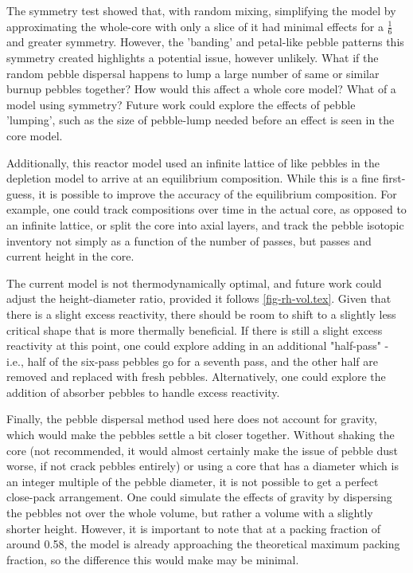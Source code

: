 The symmetry test showed that, with random mixing, simplifying the model by approximating the whole-core with only a slice of it had minimal effects for a $\frac{1}{6}$ and greater symmetry.  However, the 'banding' and petal-like pebble patterns this symmetry created highlights a potential issue, however unlikely.  What if the random pebble dispersal happens to lump a large number of same or similar burnup pebbles together?  How would this affect a whole core model?  What of a model using symmetry?  Future work could explore the effects of pebble 'lumping', such as the size of pebble-lump needed before an effect is seen in the core model.

Additionally, this reactor model used an infinite lattice of like pebbles in the depletion model to arrive at an equilibrium composition.  While this is a fine first-guess, it is possible to improve the accuracy of the equilibrium composition.  For example, one could track compositions over time in the actual core, as opposed to an infinite lattice, or split the core into axial layers, and track the pebble isotopic inventory not simply as a function of the number of passes, but passes and current height in the core.

The current model is not thermodynamically optimal, and future work could adjust the height-diameter ratio, provided it follows \ref{fig-rh-vol.tex}.  Given that there is a slight excess reactivity, there should be room to shift to a slightly less critical shape that is more thermally beneficial.  If there is still a slight excess reactivity at this point, one could explore adding in an additional "half-pass" - i.e., half of the six-pass pebbles go for a seventh pass, and the other half are removed and replaced with fresh pebbles.  Alternatively, one could explore the addition of absorber pebbles to handle excess reactivity.

Finally, the pebble dispersal method used here does not account for gravity, which would make the pebbles settle a bit closer together.  Without shaking the core (not recommended, it would almost certainly make the issue of pebble dust worse, if not crack pebbles entirely) or using a core that has a diameter which is an integer multiple of the pebble diameter, it is not possible to get a perfect close-pack arrangement.  One could simulate the effects of gravity by dispersing the pebbles not over the whole volume, but rather a volume with a slightly shorter height.  However, it is important to note that at a packing fraction of around 0.58, the model is already approaching the theoretical maximum packing fraction, so the difference this would make may be minimal.